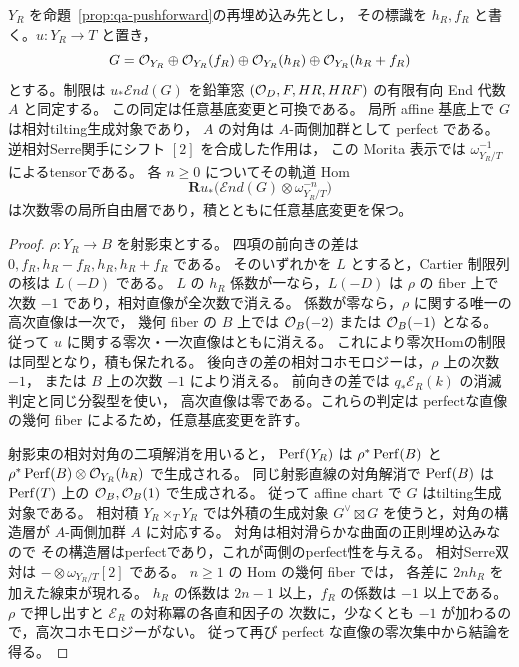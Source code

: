 \begin{proposition}[鉛筆窓の射影束上の実現と相対Serre級数]
\label{prop:qa-avatar-pencil-window-scroll}
$Y_R$ を命題~\ref{prop:qa-pushforward}の再埋め込み先とし，
その標識を $h_R,f_R$ と書く。$u:Y_R\to T$ と置き，
\[
 G=\mathcal O_{Y_R}\oplus\mathcal O_{Y_R}(f_R)
       \oplus\mathcal O_{Y_R}(h_R)\oplus\mathcal O_{Y_R}(h_R+f_R)
\]
とする。制限は $u_*\mathcal End(G)$ を鉛筆窓
$(\mathcal O_D,F,HR,HRF)$ の有限有向 End 代数 $A$ と同定する。
この同定は任意基底変更と可換である。
局所 affine 基底上で $G$ は相対tilting生成対象であり，
$A$ の対角は $A$-両側加群として perfect である。
逆相対Serre関手にシフト $[2]$ を合成した作用は，
この Morita 表示では $\omega_{Y_R/T}^{-1}$ によるtensorである。
各 $n\geq0$ についてその軌道 Hom
\[
 \mathbf R u_*\bigl(\mathcal End(G)\otimes
                   \omega_{Y_R/T}^{-n}\bigr)
\]
は次数零の局所自由層であり，積とともに任意基底変更を保つ。
\end{proposition}
\begin{proof}
$\rho:Y_R\to B$ を射影束とする。
四項の前向きの差は $0,f_R,h_R-f_R,h_R,h_R+f_R$ である。
そのいずれかを $L$ とすると，Cartier 制限列の核は $L(-D)$ である。
$L$ の $h_R$ 係数が一なら，$L(-D)$ は $\rho$ の fiber 上で
次数 $-1$ であり，相対直像が全次数で消える。
係数が零なら，$\rho$ に関する唯一の高次直像は一次で，
幾何 fiber の $B$ 上では $\mathcal O_B(-2)$ または $\mathcal O_B(-1)$ となる。
従って $u$ に関する零次・一次直像はともに消える。
これにより零次Homの制限は同型となり，積も保たれる。
後向きの差の相対コホモロジーは，$\rho$ 上の次数 $-1$，
または $B$ 上の次数 $-1$ により消える。
前向きの差では $q_*\mathcal E_R(k)$ の消滅判定と同じ分裂型を使い，
高次直像は零である。これらの判定は
perfectな直像の幾何 fiber によるため，任意基底変更を許す。

射影束の相対対角の二項解消を用いると，
$\operatorname{Perf}(Y_R)$ は $\rho^*\operatorname{Perf}(B)$ と
$\rho^*\operatorname{Perf}(B)\otimes\mathcal O_{Y_R}(h_R)$ で生成される。
同じ射影直線の対角解消で $\operatorname{Perf}(B)$ は
$\operatorname{Perf}(T)$ 上の $\mathcal O_B,\mathcal O_B(1)$ で生成される。
従って affine chart で $G$ はtilting生成対象である。
相対積 $Y_R\times_TY_R$ では外積の生成対象
$G^\vee\boxtimes G$ を使うと，対角の構造層が
$A$-両側加群 $A$ に対応する。
対角は相対滑らかな曲面の正則埋め込みなので
その構造層はperfectであり，これが両側のperfect性を与える。
相対Serre双対は $-\otimes\omega_{Y_R/T}[2]$ である。
$n\geq1$ の Hom の幾何 fiber では，
各差に $2nh_R$ を加えた線束が現れる。
$h_R$ の係数は $2n-1$ 以上，$f_R$ の係数は $-1$ 以上である。
$\rho$ で押し出すと $\mathcal E_R$ の対称冪の各直和因子の
次数に，少なくとも $-1$ が加わるので，高次コホモロジーがない。
従って再び perfect な直像の零次集中から結論を得る。
\end{proof}

